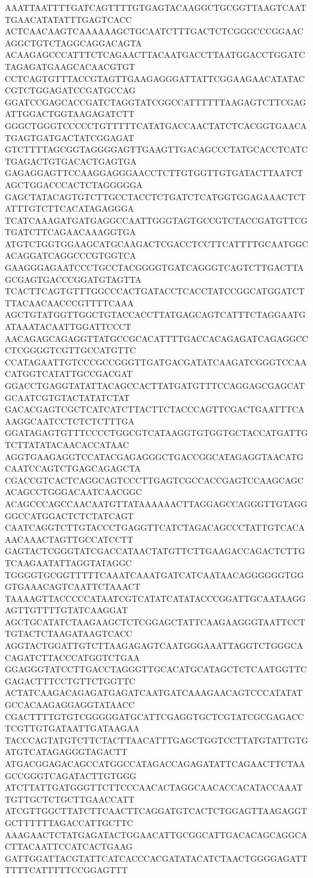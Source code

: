 AAATTAATTTTGATCAGTTTTGTGAGTACAAGGCTGCGGTTAAGTCAATTGAACATATATTTGAGTCACC
ACTCAACAAGTCAAAAAAGCTGCAATCTTTGACTCTCGGGCCCGGAACAGGCTGTCTAGGCAGGACAGTA
ACAAGAGCCCATTTCTCAGAACTTACAATGACCTTAATGGACCTGGATCTAGAGATGAAGCACAACGTGT
CCTCAGTGTTTACCGTAGTTGAAGAGGGATTATTCGGAAGAACATATACCGTCTGGAGATCCGATGCCAG
GGATCCGAGCACCGATCTAGGTATCGGCCATTTTTTAAGAGTCTTCGAGATTGGACTGGTAAGAGATCTT
GGGCTGGGTCCCCCTGTTTTTCATATGACCAACTATCTCACGGTGAACATGAGTGATGACTATCGGAGAT
GTCTTTTAGCGGTAGGGGAGTTGAAGTTGACAGCCCTATGCACCTCATCTGAGACTGTGACACTGAGTGA
GAGAGGAGTTCCAAGGAGGGAACCTCTTGTGGTTGTGATACTTAATCTAGCTGGACCCACTCTAGGGGGA
GAGCTATACAGTGTCTTGCCTACCTCTGATCTCATGGTGGAGAAACTCTATTTGTCTTCACATAGAGGGA
TCATCAAAGATGATGAGGCCAATTGGGTAGTGCCGTCTACCGATGTTCGTGATCTTCAGAACAAAGGTGA
ATGTCTGGTGGAAGCATGCAAGACTCGACCTCCTTCATTTTGCAATGGCACAGGATCAGGCCCGTGGTCA
GAAGGGAGAATCCCTGCCTACGGGGTGATCAGGGTCAGTCTTGACTTAGCGAGTGACCCGGATGTAGTTA
TCACTTCAGTGTTTGGCCCACTGATACCTCACCTATCCGGCATGGATCTTTACAACAACCCGTTTTCAAA
AGCTGTATGGTTGGCTGTACCACCTTATGAGCAGTCATTTCTAGGAATGATAAATACAATTGGATTCCCT
AACAGAGCAGAGGTTATGCCGCACATTTTGACCACAGAGATCAGAGGCCCTCGGGGTCGTTGCCATGTTC
CCATAGAATTGTCCCGCCGGGTTGATGACGATATCAAGATCGGGTCCAACATGGTCATATTGCCGACGAT
GGACCTGAGGTATATTACAGCCACTTATGATGTTTCCAGGAGCGAGCATGCAATCGTGTACTATATCTAT
GACACGAGTCGCTCATCATCTTACTTCTACCCAGTTCGACTGAATTTCAAAGGCAATCCTCTCTCTTTGA
GGATAGAGTGTTTCCCCTGGCGTCATAAGGTGTGGTGCTACCATGATTGTCTTATATACAACACCATAAC
AGGTGAAGAGGTCCATACGAGAGGGCTGACCGGCATAGAGGTAACATGCAATCCAGTCTGAGCAGAGCTA
CGACCGTCACTCAGGCAGTCCCTTGAGTCGCCACCGAGTCCAAGCAGCACAGCCTGGGACAATCAACGGC
ACAGCCCAGCCAACAATGTTATAAAAAACTTAGGAGCCAGGGTTGTAGGGGCCATGGACTCTCTATCAGT
CAATCAGGTCTTGTACCCTGAGGTTCATCTAGACAGCCCTATTGTCACAAACAAACTAGTTGCCATCCTT
GAGTACTCGGGTATCGACCATAACTATGTTCTTGAAGACCAGACTCTTGTCAAGAATATTAGGTATAGGC
TGGGGTGCGGTTTTTCAAATCAAATGATCATCAATAACAGGGGGGTGGGTGAAACAGTCAATTCTAAACT
TAAAAGTTACCCCCATAATCGTCATATCATATACCCGGATTGCAATAAGGAGTTGTTTTGTATCAAGGAT
AGCTGCATATCTAAGAAGCTCTCGGAGCTATTCAAGAAGGGTAATTCCTTGTACTCTAAGATAAGTCACC
AGGTACTGGATTGTCTTAAGAGAGTCAATGGGAAATTAGGTCTGGGCACAGATCTTACCCATGGTCTGAA
GGAGGGTATCCTTGACCTAGGGTTGCACATGCATAGCTCTCAATGGTTCGAGACTTTCCTGTTCTGGTTC
ACTATCAAGACAGAGATGAGATCAATGATCAAAGAACAGTCCCATATATGCCACAAGAGGAGGTATAACC
CGACTTTTGTGTCGGGGGATGCATTCGAGGTGCTCGTATCGCGAGACCTCGTTGTGATAATTGATAAGAA
TACCCAGTATGTCTTCTACTTAACATTTGAGCTGGTCCTTATGTATTGTGATGTCATAGAGGGTAGACTT
ATGACGGAGACAGCCATGGCCATAGACCAGAGATATTCAGAACTTCTAAGCCGGGTCAGATACTTGTGGG
ATCTTATTGATGGGTTCTTCCCAACACTAGGCAACACCACATACCAAATTGTTGCTCTGCTTGAACCATT
ATCGTTGGCTTATCTTCAACTTCAGGATGTCACTCTGGAGTTAAGAGGTGCTTTTTTAGACCATTGCTTC
AAAGAACTCTATGAGATACTGGAACATTGCGGCATTGACACAGCAGGCACTTACAATTCCATCACTGAAG
GATTGGATTACGTATTCATCACCCACGATATACATCTAACTGGGGAGATTTTTTCATTTTTCCGGAGTTT
